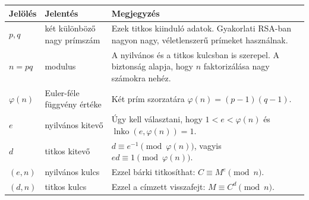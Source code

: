 \begingroup
\setlength{\tabcolsep}{4pt}
\begin{tabularx}{\textwidth}{>{\bfseries}L{0.17\textwidth}L{0.28\textwidth}X}
\toprule
Jelölés & Jelentés & Megjegyzés \\
\midrule
$p,q$ & két különböző nagy prímszám & Ezek titkos kiinduló adatok. Gyakorlati RSA-ban nagyon nagy, véletlenszerű prímeket használnak. \\
$n=pq$ & modulus & A nyilvános és a titkos kulcsban is szerepel. A biztonság alapja, hogy $n$ faktorizálása nagy számokra nehéz. \\
$\varphi(n)$ & Euler-féle függvény értéke & Két prím szorzatára $\varphi(n)=(p-1)(q-1)$. \\
$e$ & nyilvános kitevő & Úgy kell választani, hogy $1<e<\varphi(n)$ és $\operatorname{lnko}(e,\varphi(n))=1$. \\
$d$ & titkos kitevő & $d\equiv e^{-1}\pmod{\varphi(n)}$, vagyis $ed\equiv1\pmod{\varphi(n)}$. \\
$(e,n)$ & nyilvános kulcs & Ezzel bárki titkosíthat: $C\equiv M^e\pmod n$. \\
$(d,n)$ & titkos kulcs & Ezzel a címzett visszafejt: $M\equiv C^d\pmod n$. \\
\bottomrule
\end{tabularx}
\endgroup
